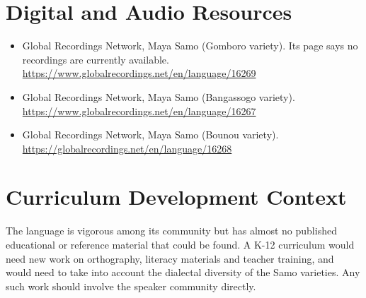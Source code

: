 \documentclass[12pt]{article}
\begin{document}
\section{Digital and Audio Resources}
\begin{itemize}
\item Global Recordings Network, Maya Samo (Gomboro variety). Its page says no recordings are currently available. \url{https://www.globalrecordings.net/en/language/16269}
\item Global Recordings Network, Maya Samo (Bangassogo variety). \url{https://www.globalrecordings.net/en/language/16267}
\item Global Recordings Network, Maya Samo (Bounou variety). \url{https://globalrecordings.net/en/language/16268}
\end{itemize}

\section{Curriculum Development Context}
The language is vigorous among its community but has almost no published educational or reference material that could be found. A K-12 curriculum would need new work on orthography, literacy materials and teacher training, and would need to take into account the dialectal diversity of the Samo varieties. Any such work should involve the speaker community directly.
\end{document}
